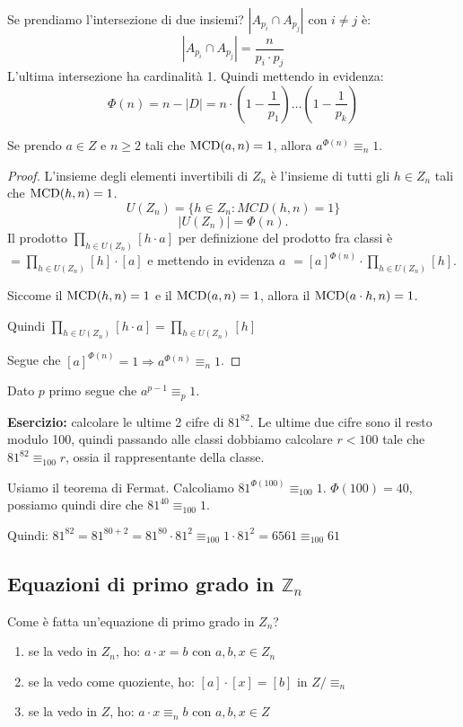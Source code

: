 Se prendiamo l'intersezione di due insiemi? $|A_{p_i} \cap A_{p_j}|$ con $i \neq j$ \`e:
\[
|A_{p_i} \cap A_{p_j}| = \frac{n}{p_i \cdot p_j}
\]
L'ultima intersezione ha cardinalit\`a 1. Quindi mettendo in evidenza:
\[
\Phi (n) = n - |D| = n \cdot (1 - \frac{1}{p_1}) \dots (1 - \frac{1}{p_k})
\]
\begin{theorem}
Se prendo $a \in Z$ e $n \ge 2$ tali che $\operatorname{MCD}(a, n) = 1$, allora $a^{\Phi(n)} \equiv_n 1$. 
\end{theorem}
\begin{proof}
L'insieme degli elementi invertibili di $Z_n$ \`e l'insieme di tutti gli $h \in Z_n$ tali che $\operatorname{MCD}(h, n) = 1$.
\[
U(Z_n) = \{ h \in Z_n : MCD(h, n) = 1 \}
\]
\[
|U(Z_n)| = \Phi(n). 
\]
Il prodotto $\prod_{h \in U(Z_n)} [h \cdot a]$  per definizione del prodotto fra classi \`e $= \prod_{h \in U(Z_n)} [h] \cdot [a]$ e mettendo in evidenza $a$ $= [a]^{\Phi(n)} \cdot \prod_{h \in U(Z_n)} [h]$.

Siccome il $\operatorname{MCD}(h, n) = 1$ e il $\operatorname{MCD}(a, n) = 1$, allora il $\operatorname{MCD}(a \cdot h, n) = 1$.

Quindi $\prod_{h \in U(Z_n)} [h \cdot a] = \prod_{h \in U(Z_n)} [h]$

Segue che $[a]^{\Phi(n)} = 1 \Rightarrow a^{\Phi(n)} \equiv_n 1$.
\end{proof}

\begin{cor}
Dato $p$ primo segue che $a^{p-1} \equiv_p 1$.
\end{cor}

\textbf{Esercizio:} calcolare le ultime 2 cifre di $81^{82}$. Le ultime due cifre sono il resto modulo 100, quindi passando alle classi dobbiamo calcolare $r < 100$ tale che $81^{82} \equiv_{100} r$, ossia il rappresentante della classe.

Usiamo il teorema di Fermat. Calcoliamo $81^{\Phi (100)} \equiv_{100} 1$. $\Phi(100) = 40$, possiamo quindi dire che $81^{40} \equiv_{100} 1$.

Quindi: $81^{82} = 81^{80 + 2} = 81^{80} \cdot 81^{2} \equiv_{100} 1 \cdot 81^{2} = 6561 \equiv_{100} 61$

\subsection{Equazioni di primo grado in $\mathbb{Z}_n$}

Come \`e fatta un'equazione di primo grado in $Z_n$?

\begin{enumerate}
    \item se la vedo in $Z_n$, ho: $a \cdot x = b$ con $a, b, x \in Z_n$
    \item se la vedo come quoziente, ho: $[a] \cdot [x] = [b]$ in $Z / \equiv_n$
    \item se la vedo in $Z$, ho: $a \cdot x \equiv_n b$ con $a, b, x \in Z$
\end{enumerate}

